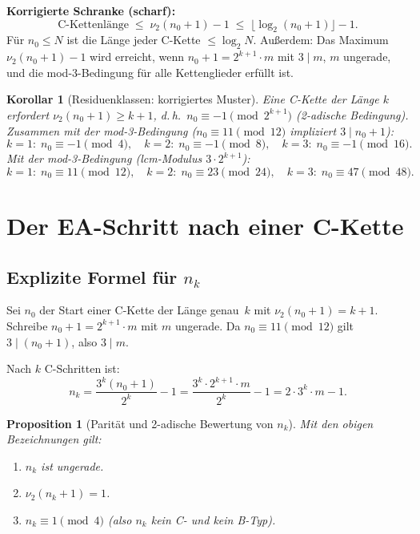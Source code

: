 \documentclass[12pt,a4paper]{article}
\newtheorem{proposition}[definition]{Proposition}
\newtheorem{korollar}[definition]{Korollar}
\newcommand{\vii}{\nu_2}
\begin{document}
\begin{tcolorbox}[ergebnis]
\textbf{Korrigierte Schranke (scharf):}
\[
  \text{C-Kettenlänge} \;\leq\; \vii(n_0+1) - 1 \;\leq\; \lfloor\log_2(n_0+1)\rfloor - 1.
\]
Für $n_0 \leq N$ ist die Länge jeder C-Kette $\leq \log_2 N$.
Außerdem: Das Maximum $\vii(n_0+1) - 1$ wird erreicht, wenn
$n_0+1 = 2^{k+1} \cdot m$ mit $3 \mid m$, $m$ ungerade, und die
mod-3-Bedingung für alle Kettenglieder erfüllt ist.
\end{tcolorbox}

\begin{korollar}[Residuenklassen: korrigiertes Muster]
\label{kor:muster-korr}
Eine C-Kette der Länge $k$ erfordert $\vii(n_0+1) \geq k+1$, d.\,h.\
$n_0 \equiv -1 \pmod{2^{k+1}}$ (2-adische Bedingung). Zusammen mit der
mod-3-Bedingung ($n_0 \equiv 11 \pmod{12}$ impliziert $3 \mid n_0+1$):
\[
  k=1\colon\; n_0 \equiv -1 \pmod{4},\quad
  k=2\colon\; n_0 \equiv -1 \pmod{8},\quad
  k=3\colon\; n_0 \equiv -1 \pmod{16}.
\]
Mit der mod-3-Bedingung (lcm-Modulus $3 \cdot 2^{k+1}$):
\[
  k=1\colon\; n_0 \equiv 11 \pmod{12},\quad
  k=2\colon\; n_0 \equiv 23 \pmod{24},\quad
  k=3\colon\; n_0 \equiv 47 \pmod{48}.
\]
\end{korollar}

\section{Der EA-Schritt nach einer C-Kette}
\label{sec:eastep}

\subsection{Explizite Formel für $n_k$}

Sei $n_0$ der Start einer C-Kette der Länge genau~$k$ mit $\vii(n_0+1) = k+1$.
Schreibe $n_0 + 1 = 2^{k+1} \cdot m$ mit $m$ ungerade.
Da $n_0 \equiv 11 \pmod{12}$ gilt $3 \mid (n_0+1)$, also $3 \mid m$.

Nach $k$ C-Schritten ist:
\[
  n_k = \frac{3^k(n_0+1)}{2^k} - 1
      = \frac{3^k \cdot 2^{k+1} \cdot m}{2^k} - 1
      = 2 \cdot 3^k \cdot m - 1.
\]

\begin{proposition}[Parität und 2-adische Bewertung von $n_k$]
\label{prop:nk}
Mit den obigen Bezeichnungen gilt:
\begin{enumerate}[label=(\roman*)]
  \item $n_k$ ist ungerade.
  \item $\vii(n_k + 1) = 1$.
  \item $n_k \equiv 1 \pmod 4$ (also $n_k$ kein C- und kein B-Typ).
\end{enumerate}
\end{proposition}
\end{document}
